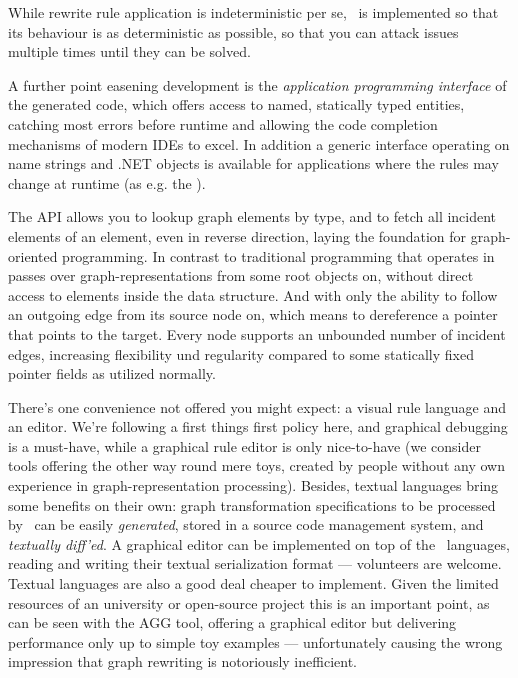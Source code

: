 While rewrite rule application is indeterministic per se, \GrG\ is implemented so that its behaviour is as deterministic as possible, so that you can attack issues multiple times until they can be solved.

A further point easening development is the \emph{application programming interface} of the generated code,
which offers access to named, statically typed entities, catching most errors before runtime and allowing the code completion mechanisms of modern IDEs to excel.
In addition a generic interface operating on name strings and .NET objects is available for applications where the rules may change at runtime (as e.g. the \GrShell).

The API allows you to lookup graph elements by type, and to fetch all incident elements of an element, even in reverse direction, laying the foundation for graph-oriented programming.
In contrast to traditional programming that operates in passes over graph-representations from some root objects on, without direct access to elements inside the data structure. 
And with only the ability to follow an outgoing edge from its source node on, which means to dereference a pointer that points to the target.
Every node supports an unbounded number of incident edges, increasing flexibility und regularity compared to some statically fixed pointer fields as utilized normally.

There's one convenience not offered you might expect: a visual rule language and an editor.
We're following a first things first policy here, and graphical debugging is a must-have, while a graphical rule editor is only nice-to-have (we consider tools offering the other way round mere toys, created by people without any own experience in graph-representation processing).%
Besides, textual languages bring some benefits on their own: graph transformation specifications to be processed by \GrG\ can be easily \emph{generated}, stored in a source code management system, and \emph{textually diff'ed}.
A graphical editor can be implemented on top of the \GrG\ languages, reading and writing their textual serialization format --- volunteers are welcome.
Textual languages are also a good deal cheaper to implement.
Given the limited resources of an university or open-source project this is an important point,
as can be seen with the AGG\cite{agg} tool, offering a graphical editor but delivering performance only up to simple toy examples
--- unfortunately causing the wrong impression that graph rewriting is notoriously inefficient.

